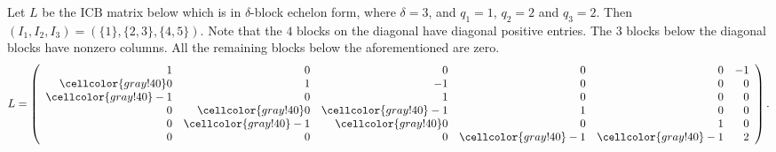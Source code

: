 \documentclass[ALCO]{cedram}
\newcommand{\y}{\cellcolor{gray!40}}
\newcommand{\icb}{\mbox{$\mathrm{ICB}$}}
\begin{document}
\begin{example}
Let $L$ be the $\icb$ matrix below which is in $\delta$-block echelon
form, where $\delta=3$, and $q_1=1$, $q_2=2$ and $q_3=2$. Then
$(I_1,I_2,I_3)=(\{1\},\{2,3\},\{4,5\})$. Note that the $4$ blocks on
the diagonal have diagonal positive entries. The $3$ blocks below the
diagonal blocks have nonzero columns. All the remaining blocks below
the aforementioned are zero.
\begin{eqnarray*}
L=\left(\begin{array}{rrrrrr}
1&0&0&0&0&-1\\
\y0&1&-1&0&0&0\\
\y-1&0&1&0&0&0\\
0&\y0&\y-1&1&0&0\\
0&\y-1&\y0&0&1&0\\
0&0&0&\y-1&\y-1&2\\
\end{array}\right).
\end{eqnarray*}
\end{example}
\end{document}
